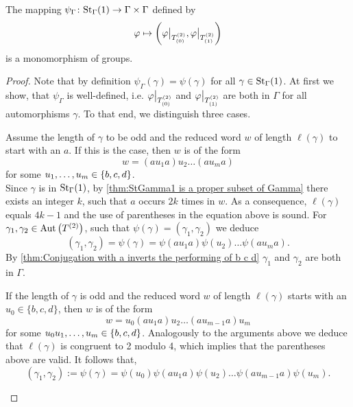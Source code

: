 \begin{lem}\label{thm:psi Gamma}
The mapping $\psi_\Gamma\colon\St[\Gamma]{1}\to\Gamma\times\Gamma$ defined by
\begin{equation*}
\varphi\mapsto\left(\varphi\big\vert_{\ST{(0)}},\varphi\big\vert_{\ST{(1)}}\right)
\end{equation*}
is a monomorphism of groups.
\end{lem}
\begin{proof}
Note that by definition $\psi_\Gamma(\gamma)=\psi(\gamma)$ for all $\gamma\in\St[\Gamma]{1}$. At first we show, that $\psi_\Gamma$ is well-defined, i.e. $\varphi\big\vert_{\ST{(0)}}$ and $\varphi\big\vert_{\ST{(1)}}$ are both in $\Gamma$ for all automorphisms $\gamma$. To that end, we distinguish three cases.
\begin{clist}
\item Assume the length of $\gamma$ to be odd and the reduced word $w$ of length $\ell(\gamma)$ to start with an $a$. If this is the case, then $w$ is of the form
\begin{equation*}
w=(au_1a)u_2\ldots (au_ma)
\end{equation*}
for some $\seq[m]{u}\in\lbrace b,c,d\rbrace$.\\
Since $\gamma$ is in $\St[\Gamma]{1}$, by \cref{thm:StGamma1 is a proper subset of Gamma} there exists an integer $k$, such that $a$ occurs $2k$ times in $w$. As a consequence, $\ell(\gamma)$ equals $4k-1$ and the use of parentheses in the equation above is sound. For $\gamma_1,\gamma_2\in\AutT$, such that $\psi(\gamma)=(\gamma_1,\gamma_2)$ we deduce
\begin{equation*}
(\gamma_1,\gamma_2)=\psi(\gamma)=\psi(au_1a)\psi(u_2)\ldots \psi(au_ma).
\end{equation*}
By \cref{thm:Conjugation with a inverts the performing of b c d} $\gamma_1$ and $\gamma_2$ are both in $\Gamma$.
\item If the length of $\gamma$ is odd and the reduced word $w$ of length $\ell(\gamma)$ starts with an $u_0\in\lbrace b,c,d\rbrace$, then $w$ is of the form
\begin{equation*}
w=u_0(au_1a)u_2\ldots (au_{m-1}a)u_m
\end{equation*}
for some $u_0\seq[m]{u}\in\lbrace b,c,d\rbrace$. Analogously to the arguments above we deduce that $\ell(\gamma)$ is congruent to 2 modulo 4, which implies that the parentheses above are valid. It follows that,
\begin{equation*}
(\gamma_1,\gamma_2):=\psi(\gamma)=\psi(u_0)\psi(au_1a)\psi(u_2)\ldots \psi(au_{m-1}a)\psi(u_m).

\end{equation*}
\end{clist}
\end{proof}
